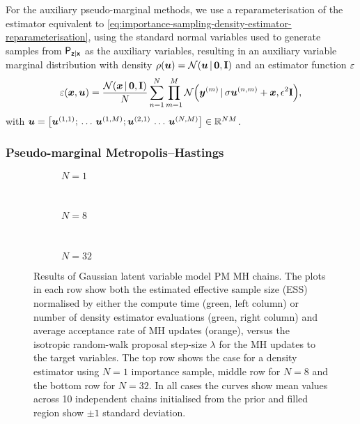 For the auxiliary pseudo-marginal methods, we use a reparameterisation of the estimator equivalent to \eqref{eq:importance-sampling-density-estimator-reparameterisation}, using the standard normal variables used to generate samples from $\mathsf{P}_{\boldsymbol{\mathsf{z}}|\boldsymbol{\mathsf{x}}}$ as the auxiliary variables, resulting in an auxiliary variable marginal distribution with density $\rho(\vct{u}) = \nrm{\vct{u}\gvn\vct{0},\mathbf{I}}$ and an estimator function $\varepsilon$
\begin{equation}
  \esttgtdens(\vct{x},\vct{u}) =
  \frac{\nrm{\vct{x} \gvn \vct{0},\mathbf{I}}}{N} \sum_{n=1}^N 
  \prod_{m=1}^M \nrm{\vct{y}^{(m)} \gvn \sigma \vct{u}^{(n,m)} + \vct{x}, \epsilon^2\mathbf{I}},
\end{equation}
with $\vct{u} = \lsb \vct{u}^{(1,1)}; \,\dots\, \vct{u}^{(1,M)}; \vct{u}^{(2,1)}\,\dots\,\vct{u}^{(N,M)}\rsb \in \reals^{NM}$.

\subsubsection{Pseudo-marginal Metropolis--Hastings}

\begin{figure}
\centering
\begin{subfigure}[b]{\linewidth}
\centering
  \caption{$N=1$}
  \label{sfig:pm-mh-1-gaussian-latent}
\end{subfigure}
\\[3mm]
\begin{subfigure}[b]{\linewidth}
\centering
  \caption{$N=8$}
  \label{sfig:pm-mh-8-gaussian-latent}
\end{subfigure}
\\[3mm]
\begin{subfigure}[b]{\linewidth}
\centering
  \caption{$N=32$}
  \label{sfig:pm-mh-32-gaussian-latent}
\end{subfigure}
\caption[\acs{PM} \acs{MH} Gaussian model results.]{
Results of Gaussian latent variable model \ac{PM} \acs{MH} chains. The plots in each row show both the estimated effective sample size (ESS) normalised by either the compute time (green, left column) or number of density estimator evaluations (green, right column) and average acceptance rate of \ac{MH} updates (orange), versus the isotropic random-walk proposal step-size $\lambda$ for the \ac{MH} updates to the target variables. The top row shows the case for a density estimator using $N=1$ importance sample, middle row for $N=8$ and the bottom row for $N=32$. In all cases the curves show mean values across 10 independent chains initialised from the prior and filled region show $\pm 1$ standard deviation.}
\label{fig:pmmh-gaussian-latent-results}
\end{figure}

